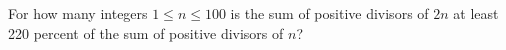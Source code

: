For how many integers $1\le n\le100$ is the sum of positive divisors of $2n$ at least 220 percent of the sum of positive divisors of $n$?
